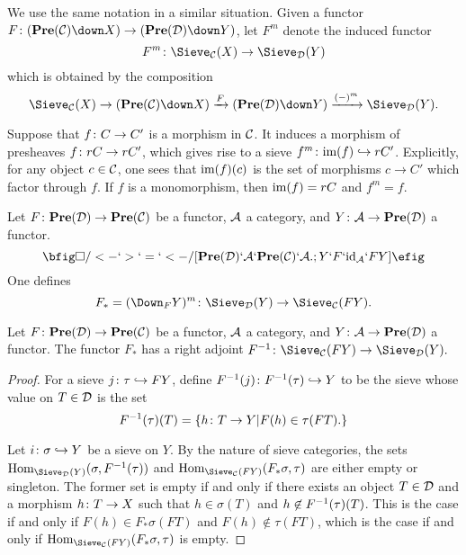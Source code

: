 \documentclass[10pt]{amsart}
\begin{document}
We use the same notation in a similar situation.  Given a functor $F\taking (\Pre(\mcC)\down X)\to(\Pre(\mcD)\down Y)$, let $F^m$ denote the induced functor $$F^m\taking \Sieve_\mcC(X)\to\Sieve_\mcD(Y)$$ which is obtained by the composition $$\Sieve_\mcC(X)\to(\Pre(\mcC)\down X)\To{F}(\Pre(\mcD)\down Y)\To{(-)^m}\Sieve_\mcD(Y).$$

\begin{example}

Suppose that $f\colon C\rightarrow C'$ is a morphism in $\mathcal{C}$.  It induces a morphism of presheaves $f\colon rC\rightarrow rC'$, which gives rise to a sieve
$f^m\colon \textnormal{im}(f)\hookrightarrow rC'$.  Explicitly, for any object $c\in\mathcal{C}$, one sees that $\textnormal{im}(f)(c)$ is the set of morphisms $c\to C'$ which
factor through $f$.  If $f$ is a monomorphism, then $\textnormal{im}(f)=rC$ and $f^m=f$.

\end{example}

Let $F\colon{\bf Pre}(\mathcal{D})\rightarrow{\bf Pre}(\mathcal{C})$ be a functor, $\mathcal{A}$ a category, and $Y\colon\mathcal{A}\rightarrow{\bf Pre}(\mathcal{D})$ a functor.  $$\bfig
\square/<-`>`=`<-/[\Pre(\mcD)`\mcA`\Pre(\mcC)`\mcA.;Y`F`\id_\mcA`FY] \efig$$  One defines $$F_*=(\Down_F Y)^m\taking\Sieve_\mcD(Y)\to\Sieve_\mcC(FY).$$

\begin{lemma}\label{adj to push}

Let $F\colon{\bf Pre}(\mathcal{D})\rightarrow{\bf Pre}(\mathcal{C})$ be a functor, $\mathcal{A}$ a category, and $Y\colon\mathcal{A}\rightarrow{\bf Pre}(\mathcal{D})$ a functor.  The functor $F_*$ has a right adjoint $F^\m1\taking\Sieve_\mcC(FY)\to\Sieve_\mcD(Y).$

\end{lemma}

\begin{proof}

For a sieve $j\colon\tau\hookrightarrow FY$, define $F^\m1(j)\taking F^\m1(\tau)\inj Y$ to be the sieve whose value on $T\in\mathcal{D}$ is the set $$F^\m1(\tau)(T)=\{h\taking T\to Y|F(h)\in \tau(FT).\}$$

Let $i\colon\sigma\hookrightarrow Y$ be a sieve on $Y$.  By the nature of sieve categories, the sets $\Hom_{\Sieve_\mcD(Y)}(\sigma,F^\m1(\tau))$ and $\Hom_{\Sieve_\mcC(FY)}(F_*\sigma,\tau)$ are either empty or singleton.  The former set is empty if and only if there exists an object $T\in\mathcal{D}$ and a morphism $h\colon T\rightarrow X$ such that $h\in\sigma(T)$ and $h\not\in F^\m1(\tau)(T)$.  This is the case if and only if $F(h)\in F_*\sigma(FT)$ and $F(h)\not\in \tau(FT)$, which is the case if and only if $\Hom_{\Sieve_\mcC(FY)}(F_*\sigma,\tau)$ is empty.

\end{proof}
\end{document}
